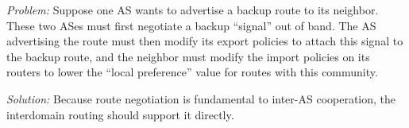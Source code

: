 \vspace{0.05in}
\noindent
{\em Problem:} 
Suppose one AS wants to advertise a backup route to its
neighbor.  These two ASes must first negotiate a backup
``signal'' out of band.  The AS advertising the route must then modify
its export policies to attach this signal to the backup route, and the
neighbor must modify the import policies on its routers to lower
the ``local preference'' value for routes with this community.

\vspace{0.05in}
\noindent
{\em Solution:} 
Because route negotiation is fundamental to inter-AS
cooperation, the interdomain routing should support it directly. 




